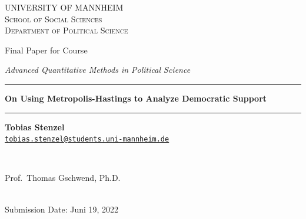 \documentclass[12pt,english,a4paper,oneside]{article}
\theoremstyle{definition}
\theoremstyle{definition}
\theoremstyle{definition}
\theoremstyle{definition}
\theoremstyle{remark}
\begin{document}
\begin{titlepage}

    \begin{center}
    \large{ \textsc{ \uppercase{University of Mannheim} \\ \vspace{-0.2cm}
School of Social Sciences \\ \vspace{-0.2cm}
Department of Political Science}}

      
        \vspace{3.5cm}
        

       \large{   Final Paper for Course   }


       \large{ \textit{   Advanced Quantitative Methods in Political Science   }}

\renewcommand{\linethickness}{0.03em}
\rule{\linewidth}{\linethickness}


       \LARGE{ \textbf{   On Using Metropolis-Hastings to Analyze Democratic Support   }}


       \large{  }

        \vspace{-0.2cm}
\rule{\linewidth}{\linethickness}


\begin{minipage}[t]{0.5\textwidth}
\begin{flushleft}
\singlespacing
 \textbf{Tobias Stenzel}  \\ 


 \href{mailto:tobias.stenzel@students.uni-mannheim.de}{\nolinkurl{tobias.stenzel@students.uni-mannheim.de}}  \\ 

\end{flushleft}
\end{minipage}
\begin{minipage}[t]{0.4\textwidth}
\hfill
\end{minipage}\\
\vspace{0.2cm}
\begin{minipage}[t]{0.35\textwidth}
\hfill
\end{minipage}
\begin{minipage}[t]{0.55\textwidth}
\begin{flushright}
\singlespacing
     Prof.~Thomas Gschwend, Ph.D.  \\       

\end{flushright}
\end{minipage}\\
%


         \vfill
         Submission Date: Juni 19, 2022 \\ 
        





         \vfill



     \end{center}
    \thispagestyle{empty}
\end{titlepage}
\end{document}
